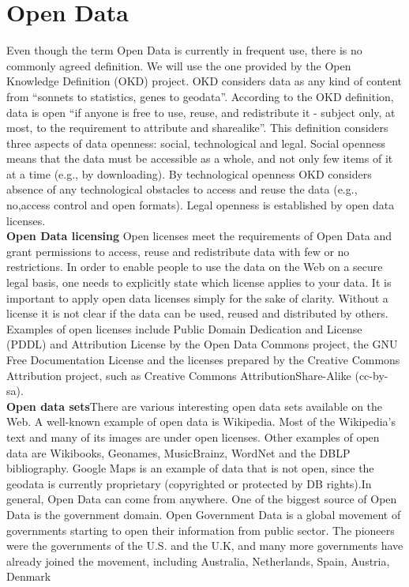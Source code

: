\documentclass[a4paper,12pt,oneside]{report}
\begin{document}
{{{\section{Open Data}
{Even though the term Open Data is currently in frequent use, there is no commonly agreed definition. We will use the one provided by the Open Knowledge Definition (OKD) project. OKD considers data as any kind of content from “sonnets to statistics, genes to geodata”. According to the OKD definition, data is open “if anyone is free to use, reuse, and redistribute it - subject only, at most, to the requirement to attribute and sharealike”. This definition considers three aspects of data openness: social, technological and legal. Social openness means that the data must be accessible as a whole, and not only few items of it at a time (e.g., by downloading). By technological openness OKD considers absence of any technological obstacles to access and reuse the data (e.g., no,access control and open formats). Legal openness is established by open data licenses.\\
\textbf{Open Data licensing} Open licenses meet the requirements of Open Data and grant permissions to access, reuse and redistribute data with few or no restrictions. In order to enable people to use the data on the Web on a secure legal basis, one needs to
explicitly state which license applies to your data. It is important to apply open data licenses simply for the sake of clarity. Without a license it is not clear if the data can be used, reused and distributed by others. Examples of open licenses include Public
Domain Dedication and License (PDDL) and Attribution License by the Open Data Commons project, the GNU Free Documentation License and the licenses prepared by the Creative Commons Attribution project, such as Creative Commons AttributionShare-Alike (cc-by-sa).\\
\textbf{Open data sets}There are various interesting open data sets available on the Web. A well-known example of open data is Wikipedia. Most of the Wikipedia’s text and many of its images are under open licenses. Other examples of open data are Wikibooks, Geonames, MusicBrainz, WordNet and the DBLP bibliography. Google Maps is an example of data that is not open, since the geodata is currently proprietary (copyrighted or protected by DB rights).In general, Open Data can come from anywhere. One of the biggest source of Open Data is the government domain. Open Government Data is a global movement of governments starting to open their information from public sector. 
The pioneers were the governments of the U.S.  and the U.K, and many more governments have already joined the movement, including Australia, Netherlands, Spain, Austria, Denmark}
}}}
\end{document}
